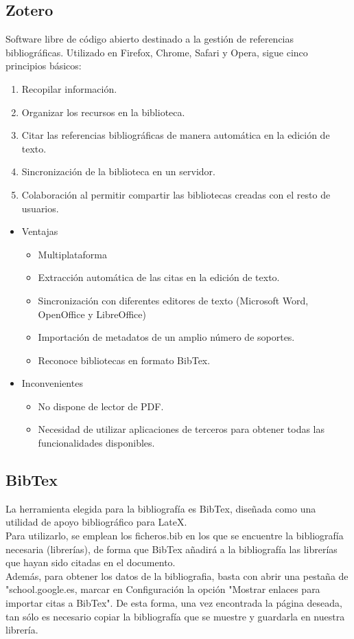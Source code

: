 \subsection{Zotero}
Software libre de código abierto destinado a la gestión de referencias bibliográficas. \cite{bibl:zotero} Utilizado en Firefox, Chrome, Safari y Opera, sigue cinco principios básicos: 
\begin{enumerate}
\item Recopilar información. 
\item Organizar los recursos en la biblioteca. 
\item Citar las referencias bibliográficas de manera automática en la edición de texto. 
\item Sincronización de la biblioteca en un servidor. 
\item Colaboración al permitir compartir las bibliotecas creadas con el resto de usuarios. 
\end{enumerate}
\begin{itemize}
\item Ventajas
\begin{itemize}
\item Multiplataforma
\item Extracción automática de las citas en la edición de texto. 
\item Sincronización con diferentes editores de texto (Microsoft Word, OpenOffice y LibreOffice)\cite{wiki:Zotero}
\item Importación de metadatos de  un amplio número de soportes.
\item Reconoce bibliotecas en formato BibTex.
\end{itemize}
\end{itemize}
\begin{itemize}
\item Inconvenientes
\begin{itemize}
\item No dispone de lector de PDF. 
\item Necesidad de utilizar aplicaciones de terceros para obtener todas las funcionalidades disponibles. 
\end{itemize}
\end{itemize}
\subsection{BibTex}
\nonzeroparskip
La herramienta elegida para la bibliografía es BibTex, diseñada como una utilidad de apoyo bibliográfico para LateX. \\
\nonzeroparskip
Para utilizarlo, se emplean los ficheros.bib en los que se encuentre la bibliografía necesaria (librerías), de forma que BibTex añadirá a la bibliografía las librerías que hayan sido citadas en el documento. \\
\nonzeroparskip
Además, para obtener los datos de la bibliografia, basta con abrir una pestaña de  "school.google.es, marcar en Configuración la opción "Mostrar enlaces para importar citas a BibTex". De esta forma, una vez encontrada la página deseada, tan sólo es necesario copiar la bibliografía que se muestre y guardarla en nuestra librería.\cite{perez1968titulo} 

